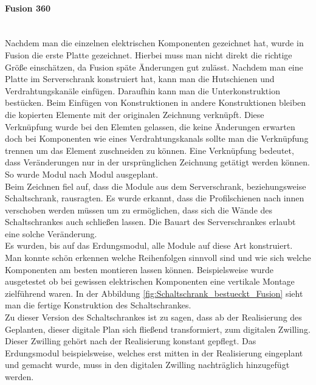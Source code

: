    \paragraph{Fusion 360}\mbox{}\\
    Nachdem man die einzelnen elektrischen Komponenten gezeichnet hat, wurde in Fusion die erste Platte gezeichnet. Hierbei muss man nicht direkt die richtige Größe einschätzen, da Fusion späte Änderungen gut zulässt. Nachdem man eine Platte im Serverschrank konstruiert hat, kann man die Hutschienen und Verdrahtungskanäle einfügen. Daraufhin kann man die Unterkonstruktion bestücken. Beim Einfügen von Konstruktionen in andere Konstruktionen bleiben die kopierten Elemente mit der originalen Zeichnung verknüpft. Diese Verknüpfung wurde bei den Elemten gelassen, die keine Änderungen erwarten doch bei Komponenten wie eines Verdrahtungskanals sollte man die Verknüpfung trennen um das Element zuschneiden zu können. Eine Verknüpfung bedeutet, dass Veränderungen nur in der ursprünglichen Zeichnung getätigt werden können. So wurde Modul nach Modul ausgeplant.\\
    Beim Zeichnen fiel auf, dass die Module aus dem Serverschrank, beziehungsweise Schaltschrank, rausragten. Es wurde erkannt, dass die Profilschienen nach innen verschoben werden müssen um zu ermöglichen, dass sich die Wände des Schaltschrankes auch schließen lassen. Die Bauart des Serverschrankes erlaubt eine solche Veränderung.\\ 
    Es wurden, bis auf das Erdungsmodul, alle Module auf diese Art konstruiert. Man konnte schön erkennen welche Reihenfolgen sinnvoll sind und wie sich welche Komponenten am besten montieren lassen können. Beispielsweise wurde ausgetestet ob bei gewissen elektrischen Komponenten eine vertikale Montage zielführend waren. In der Abbildung \ref{fig:Schaltschrank_bestueckt_Fusion} sieht man die fertige Konstruktion des Schaltschrankes.\\
    Zu dieser Version des Schaltschrankes ist zu sagen, dass ab der Realisierung des Geplanten, dieser digitale Plan sich fließend transformiert, zum digitalen Zwilling. Dieser Zwilling gehört nach der Realisierung konstant gepflegt. Das Erdungsmodul beispielsweise, welches erst mitten in der Realisierung eingeplant und gemacht wurde, muss in den digitalen Zwilling nachträglich hinzugefügt werden.
